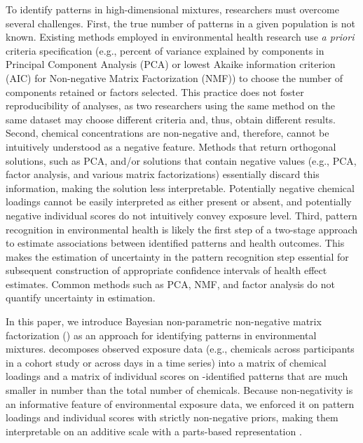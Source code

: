 To identify patterns in high-dimensional mixtures, researchers must overcome several challenges. First, the true number of patterns in a given population is not known. Existing methods employed in environmental health research use \textit{a priori} criteria specification (e.g., percent of variance explained by components in Principal Component Analysis (PCA) or lowest Akaike information criterion (AIC) for Non-negative Matrix Factorization (NMF)) to choose the number of components retained or factors selected. This practice does not foster reproducibility of analyses, as two researchers using the same method on the same dataset may choose different criteria and, thus, obtain different results. Second, chemical concentrations are non-negative and, therefore, cannot be intuitively understood as a negative feature. Methods that return orthogonal solutions, such as PCA, and/or solutions that contain negative values (e.g., PCA, factor analysis, and various matrix factorizations) essentially discard this information, making the solution less interpretable. Potentially negative chemical loadings cannot be easily interpreted as either present or absent, and potentially negative individual scores do not intuitively convey exposure level. Third, pattern recognition in environmental health is likely the first step of a two-stage approach to estimate associations between identified patterns and health outcomes. This makes the estimation of uncertainty in the pattern recognition step essential for subsequent construction of appropriate confidence intervals of health effect estimates. Common methods such as PCA, NMF, and factor analysis do not quantify uncertainty in estimation.

In this paper, we introduce Bayesian non-parametric non-negative matrix factorization (\bnmfc) as an approach for identifying patterns in environmental mixtures. \bnmf decomposes observed exposure data (e.g., chemicals across participants in a cohort study or across days in a time series) into a matrix of chemical loadings and a matrix of individual scores on \bnmfc-identified patterns that are much smaller in number than the total number of chemicals. Because non-negativity is an informative feature of environmental exposure data, we enforced it on pattern loadings and individual scores with strictly non-negative priors, making them interpretable on an additive scale with a parts-based representation \citep{lee1999learning}.

